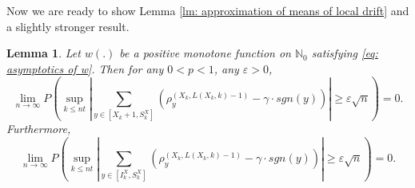 \documentclass[twoside,12pt, a4paper]{article}
\newtheorem{lemma}{Lemma}[section]
\numberwithin{equation}{section}
\theoremstyle{remark}
\newcommand{\abs}[1]{\left\vert #1 \right\vert}
\newcommand\TBD{\textcolor{red}{TBD.}}
\newcommand{\edt}[1]{\textcolor{red}{#1}} %
\begin{document}
	Now we are ready to show Lemma \ref{lm: approximation of means of local drift}
	and a slightly stronger result.
	\begin{lemma}
		Let $w(.)$ be a positive monotone function on $\mathbb{N}_0$ satisfying \eqref{eq: asymptotics of w}. Then for any $0<p<1$, any $\varepsilon>0$,
		$$
		\lim_{n\to\infty} P\left( \sup_{k\leq n t}  \abs{  	\sum_{y\in \left[X_{k}+1 ,S_{k}^X\right]} \left( \rho^{(X_k,L(X_k,k)-1)}_y -  \gamma \cdot sgn(y) \right) } \geq  \varepsilon \sqrt{n}     \right) =0.
		$$
		Furthermore,
		\[
	\lim_{n\to\infty} P\left( \sup_{k\leq n t}  \abs{  	\sum_{y\in \left[I_k^{X} ,S_{k}^X\right]} \left( \rho^{(X_k,L(X_k,k)-1)}_y -  \gamma \cdot sgn(y) \right) } \geq  \varepsilon \sqrt{n}     \right) =0.
	\]
\end{lemma}
\end{document}
